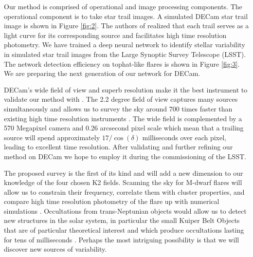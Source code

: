 \documentclass[11pt]{article}
\begin{document}
Our method is comprised of operational and image processing components. The operational component is to take star trail images. A simulated DECam star trail image is shown in Figure \ref{fig:2}. The authors of \citealt{1986PASP...98..802H} realized that each trail serves as a light curve for its corresponding source and facilitates high time resolution photometry. We have trained a deep neural network to identify stellar variability in simulated star trail images from the Large Synoptic Survey Telescope (LSST). The network detection efficiency on tophat-like flares is shown in Figure \ref{fig:3}. We are preparing the next generation of our network for DECam. 

DECam's wide field of view and superb resolution make it the best instrument to validate our method with \citep{2015AJ....150..150F}. The 2.2 degree field of view captures many sources simultaneously and allows us to survey the sky around 700 times faster than existing high time resolution instruments \citep{2007MNRAS.378..825D}. The wide field is complemented by a 570 Megapixel camera and 0.26 arcsecond pixel scale which mean that a trailing source will spend approximately $17 / \cos(\delta)$ milliseconds over each pixel, leading to excellent time resolution. After validating and further refining our method on DECam we hope to employ it during the commissioning of the LSST. 

The proposed survey is the first of its kind and will add a new dimension to our knowledge of the four chosen K2 fields. Scanning the sky for M-dwarf flares will allow us to constrain their frequency, correlate them with cluster properties, and compare high time resolution photometry of the flare up with numerical simulations \citep{2017ApJ...849...36Y,2017ApJS..232...26V}. Occultations from trans-Neptunian objects would allow us to detect new structures in the solar system, in particular the small Kuiper Belt Objects that are of particular theoretical interest and which produce occultations lasting for tens of milliseconds \citep{2000Icar..147..530R,2013AJ....146...14Z}. Perhaps the most intriguing possibility is that we will discover new sources of variability. 



\end{document}
